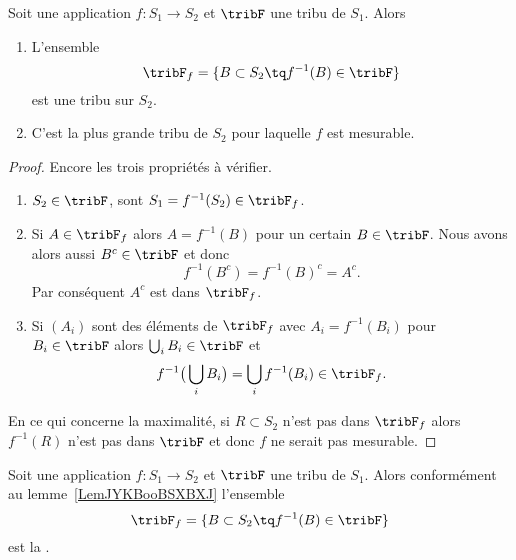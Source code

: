 \begin{lemma}       \label{LemJYKBooBSXBXJ}
    Soit une application \( f\colon S_1\to S_2\) et \( \tribF\) une tribu de \( S_1\). Alors
    \begin{enumerate}
        \item
            L'ensemble
            \begin{equation}
                \tribF_f=\{  B\subset S_2\tq f^{-1}(B)\in \tribF  \}
            \end{equation}
            est une tribu sur \( S_2\).
        \item
            C'est la plus grande tribu de \( S_2\) pour laquelle \( f\) est mesurable.
    \end{enumerate}
\end{lemma}

\begin{proof}
    Encore les trois propriétés à vérifier.
    \begin{enumerate}
        \item
            \( S_2\in\tribF\), sont \( S_1=f^{-1}(S_2)\in \tribF_f\).
        \item
            Si \( A\in \tribF_f\) alors \( A=f^{-1}(B)\) pour un certain \( B\in \tribF\). Nous avons alors aussi \( B^c\in \tribF\) et donc
            \begin{equation}
                f^{-1}(B^c)=f^{-1}(B)^c=A^c.
            \end{equation}
            Par conséquent \( A^c\) est dans \( \tribF_f\).
        \item
            Si \( (A_i)\) sont des éléments de \( \tribF_f\) avec \( A_i=f^{-1}(B_i)\) pour \( B_i\in \tribF\) alors \( \bigcup_iB_i\in\tribF\) et
            \begin{equation}
                f^{-1}\big( \bigcup_iB_i \big)=\bigcup_if^{-1}(B_i)\in\tribF_f.
            \end{equation}
    \end{enumerate}
    En ce qui concerne la maximalité, si \( R\subset S_2\) n'est pas dans \( \tribF_f\) alors \( f^{-1}(R)\) n'est pas dans \( \tribF\) et donc \( f\) ne serait pas mesurable.
\end{proof}

\begin{definition} \label{DefNOJWooLGKhmJ}
    Soit une application \( f\colon S_1\to S_2\) et \( \tribF\) une tribu de \( S_1\). Alors conformément au lemme~\ref{LemJYKBooBSXBXJ} l'ensemble
            \begin{equation}
                \tribF_f=\{  B\subset S_2\tq f^{-1}(B)\in \tribF  \}
            \end{equation}
            est la .
\end{definition}

